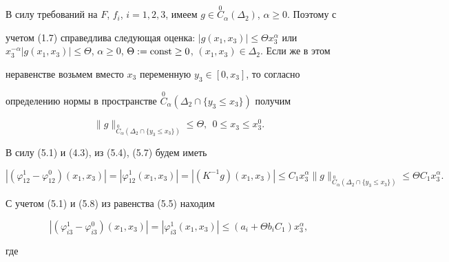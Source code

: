 В силу требований на $F$, $f_i$, $i=1,2,


3$, имеем $g\in \overset{0}{C}_{\alpha}(\Delta_2)$, $\alpha \geq 0$. Поэтому с


учетом (1.7) справедлива следующая оценка: $|g(x_1,x_3)|\leq \Theta


x_3^{\alpha}$ или $x_3^{-\alpha}|g(x_1,x_3)|\leq \Theta$, $\alpha \geq


0$, $\Theta:= \const \geq 0$, $(x_1,x_3) \in \Delta_2$. Если же в этом


неравенстве возьмем вместо $x_3$ переменную $y_3 \in [0,x_3]$, то согласно


определению нормы в пространстве $\overset{0}{C}_{\alpha}(\Delta_2\cap \{y_3


\leq x_3\})$ получим




\begin{equation}


\|g\|_{\overset{0}{C}_{\alpha}(\Delta_2\cap \{y_3 \leq x_3\})}\leq \Theta,


\ \ 0 \leq x_3 \leq x_3^0.


\end{equation}





В силу (5.1) и (4.3), из (5.4), (5.7) будем иметь




\begin{equation}


|(\varphi_{12}^1-\varphi_{12}^0)(x_1,x_3)|=|\varphi_{12}^1(x_1,x_3)|=


|(K^{-1}g )(x_1,x_3)|\leq C_1x_3^{\alpha}\|g\|_{\overset{0}{C}_{\alpha}


(\Delta_2\cap \{y_3 \leq x_3\})} \leq \Theta C_1x_3^{\alpha}.


\end{equation}


С учетом (5.1) и (5.8) из равенства (5.5) находим




\begin{equation}


|(\varphi_{i3}^1-\varphi_{i3}^0)(x_1,x_3)|=


|\varphi_{i3}^1(x_1,x_3)|\leq (a_i+


\Theta b_iC_1)x_3^{\alpha},


\end{equation}


где


